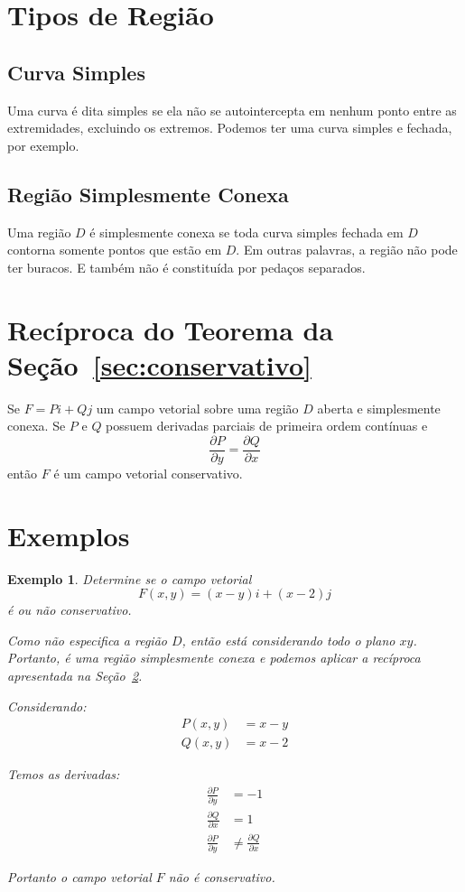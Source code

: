 \documentclass{article}
\newcommand{\PartialDer}[2] {\frac{\partial #1}{\partial #2}}
\newtheorem{example}{Exemplo}[section]
\begin{document}
    \section{Tipos de Região}
        \subsection{Curva Simples}
            Uma curva é dita simples se ela não se autointercepta em nenhum ponto entre as extremidades, excluindo os extremos.
            Podemos ter uma curva simples e fechada, por exemplo.

        \subsection{Região Simplesmente Conexa}
            Uma região $D$ é simplesmente conexa se toda curva simples fechada em $D$ contorna somente pontos que estão em
            $D$. Em outras palavras, a região não pode ter buracos. E também não é constituída por pedaços separados.

    \section{Recíproca do Teorema da Seção~\ref{sec:conservativo}}
        \label{sec:reciproca}
        Se $F = P i + Q j$ um campo vetorial sobre uma região $D$ aberta e simplesmente conexa. Se $P$ e $Q$ possuem derivadas
        parciais de primeira ordem contínuas e
        \[
            \PartialDer{P}{y} = \PartialDer{Q}{x}
        \]
        então $F$ é um campo vetorial conservativo.

    \section{Exemplos}
        \begin{example}
            Determine se o campo vetorial
            \[
                F(x,y) = (x - y)i + (x - 2)j
            \]
            é ou não conservativo.

            Como não especifica a região $D$, então está considerando todo o plano $xy$. Portanto, é uma região simplesmente
            conexa e podemos aplicar a recíproca apresentada na Seção~\ref{sec:reciproca}.

            Considerando:
            \begin{align*}
                P(x,y) &= x - y\\
                Q(x,y) &= x - 2
            \end{align*}

            Temos as derivadas:
            \begin{align*}
                \PartialDer{P}{y} &= -1\\
                \PartialDer{Q}{x} &= 1\\
                \PartialDer{P}{y} &\neq \PartialDer{Q}{x}
            \end{align*}

            Portanto o campo vetorial $F$ não é conservativo.
        \end{example}
\end{document}
